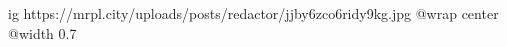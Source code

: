  
 
 
 
 

\ifcmt
  ig https://mrpl.city/uploads/posts/redactor/jjby6zco6ridy9kg.jpg
  @wrap center
  @width 0.7
\fi
